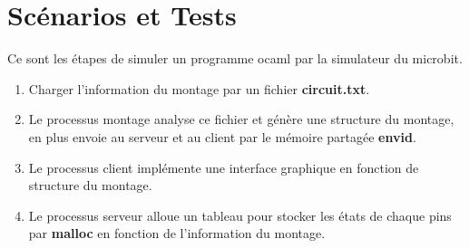 \documentclass[14px]{article}
\begin{document}
\section{Scénarios et Tests}
Ce sont les étapes de simuler un programme ocaml par la simulateur du microbit.
\begin{enumerate}
	\item Charger l'information du montage par un fichier \textbf{circuit.txt}.
	\item Le processus montage analyse ce fichier et génère une structure du montage, en plus envoie au serveur et au client par le mémoire partagée \textbf{envid}.
	\item Le processus client implémente une interface graphique en fonction de structure du montage.
	\item Le processus serveur alloue un tableau pour stocker les états de chaque pins par \textbf{malloc} en fonction de l'information du montage.
	\begin{figure}[htbp]
		\centering
\end{figure}
\end{enumerate}
\end{document}
